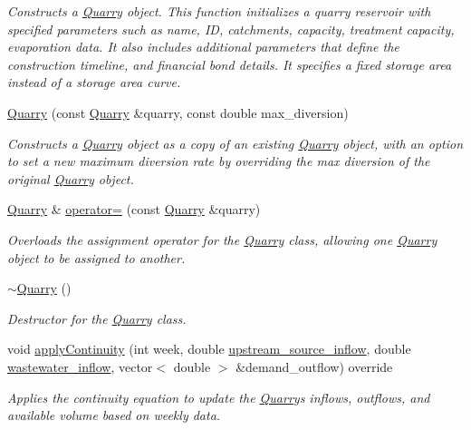 \begin{DoxyCompactItemize}
\begin{DoxyCompactList}\small\item\em Constructs a \mbox{\hyperlink{classQuarry}{Quarry}} object. This function initializes a quarry reservoir with specified parameters such as name, ID, catchments, capacity, treatment capacity, evaporation data. It also includes additional parameters that define the construction timeline, and financial bond details. It specifies a fixed storage area instead of a storage area curve. \end{DoxyCompactList}\item 
\mbox{\hyperlink{classQuarry_a5a43f5a3f1cb837bc313046cf82b49e3}{Quarry}} (const \mbox{\hyperlink{classQuarry}{Quarry}} \&quarry, const double max\+\_\+diversion)
\begin{DoxyCompactList}\small\item\em Constructs a \mbox{\hyperlink{classQuarry}{Quarry}} object as a copy of an existing \mbox{\hyperlink{classQuarry}{Quarry}} object, with an option to set a new maximum diversion rate by overriding the max diversion of the original \mbox{\hyperlink{classQuarry}{Quarry}} object. \end{DoxyCompactList}\item 
\mbox{\hyperlink{classQuarry}{Quarry}} \& \mbox{\hyperlink{classQuarry_adc3df376f620f8337b5dbf0868cf7fb6}{operator=}} (const \mbox{\hyperlink{classQuarry}{Quarry}} \&quarry)
\begin{DoxyCompactList}\small\item\em Overloads the assignment operator for the \mbox{\hyperlink{classQuarry}{Quarry}} class, allowing one \mbox{\hyperlink{classQuarry}{Quarry}} object to be assigned to another. \end{DoxyCompactList}\item 
\mbox{\hyperlink{classQuarry_a6c528c6222e8e5adc134db5cafbe62e3}{$\sim$\+Quarry}} ()
\begin{DoxyCompactList}\small\item\em Destructor for the \mbox{\hyperlink{classQuarry}{Quarry}} class. \end{DoxyCompactList}\item 
void \mbox{\hyperlink{classQuarry_a6999b854a740ce92baaa610cf5b08bd9}{apply\+Continuity}} (int week, double \mbox{\hyperlink{classWaterSource_a7a69b2e9b6030f1035e6cf44d2918ee5}{upstream\+\_\+source\+\_\+inflow}}, double \mbox{\hyperlink{classWaterSource_aeb5a2d2d83383a70ca20f3e94635a9c7}{wastewater\+\_\+inflow}}, vector$<$ double $>$ \&demand\+\_\+outflow) override
\begin{DoxyCompactList}\small\item\em Applies the continuity equation to update the \mbox{\hyperlink{classQuarry}{Quarry}}\textquotesingle{}s inflows, outflows, and available volume based on weekly data. \end{DoxyCompactList}\item 

\end{DoxyCompactItemize}
